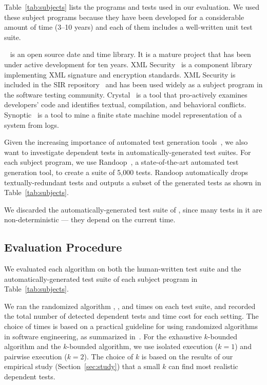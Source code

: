 Table~\ref{tab:subjects} lists the programs and
tests used in our evaluation. We used these subject
programs because they have been developed for
a considerable amount of time (3--10 years) and each
of them includes a well-written unit test suite.

\jt~\cite{jodatime} is an open source
date and time library. It is a mature project that
has been under active development
for ten years. XML Security~\cite{xmlsecurity}
is a component library implementing XML signature and encryption
standards. XML Security is included in
the SIR repository~\cite{sir} and has been used widely
as a subject program in the software testing community.
Crystal~\cite{crystal} is a tool that
pro-actively examines developers' code and
identifies textual, compilation, and behavioral conflicts.
Synoptic~\cite{synoptic} is a tool to mine a finite state
machine model representation of a system from logs.

Given the increasing importance of automated test generation
tools~\cite{PachecoLET2007, ZhangSBE2011, Csallner:2004, fraseretal:ISSTA:2011},
we also want to investigate dependent tests in automatically-generated
test suites. For each subject program, we use
Randoop~\cite{PachecoLET2007}, a state-of-the-art automated
test generation tool, to create a suite of 5,000 tests.
Randoop automatically drops textually-redundant tests 
and outputs a subset of the generated tests as
shown in Table~\ref{tab:subjects}.

We discarded the automatically-generated test suite of
\jt, since many tests in it are non-deterministic ---
they depend on the current time.


\subsection{Evaluation Procedure}

We evaluated each algorithm 
on both the human-written test suite 
and the automatically-generated test suite
of each subject program in Table~\ref{tab:subjects}.


We ran the randomized algorithm \smalltrialnum, \mediumtrialnum,
and \trialnum times on each test suite, and recorded
the total number of detected dependent tests and time cost
for each setting. The choice of \trialnum times is based
on a practical guideline for using randomized algorithms
in software engineering, as summarized in~\cite{Arcuri:2011}.
%
For the exhaustive $k$-bounded algorithm
and the \dependenceaware{} $k$-bounded algorithm,
we use isolated execution ($k = 1$) and
pairwise execution ($k = 2$). The choice of $k$ is
based on the results of our empirical
study (Section~\ref{sec:study}) that a small $k$
can find most realistic dependent tests.

